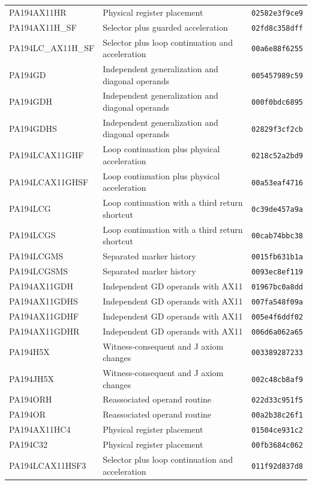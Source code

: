 \begin{longtable}{p{43mm}p{73mm}p{25mm}}
PA194AX11HR & Physical register placement & \texttt{02582e3f9ce9}\\
PA194AX11H\_SF & Selector plus guarded acceleration & \texttt{02fd8c358dff}\\
PA194LC\_AX11H\_SF & Selector plus loop continuation and acceleration & \texttt{00a6e88f6255}\\
PA194GD & Independent generalization and diagonal operands & \texttt{005457989c59}\\
PA194GDH & Independent generalization and diagonal operands & \texttt{000f0bdc6895}\\
PA194GDHS & Independent generalization and diagonal operands & \texttt{02829f3cf2cb}\\
PA194LCAX11GHF & Loop continuation plus physical acceleration & \texttt{0218c52a2bd9}\\
PA194LCAX11GHSF & Loop continuation plus physical acceleration & \texttt{00a53eaf4716}\\
PA194LCG & Loop continuation with a third return shortcut & \texttt{0c39de457a9a}\\
PA194LCGS & Loop continuation with a third return shortcut & \texttt{00cab74bbc38}\\
PA194LCGMS & Separated marker history & \texttt{0015fb631b1a}\\
PA194LCGSMS & Separated marker history & \texttt{0093ec8ef119}\\
PA194AX11GDH & Independent GD operands with AX11 & \texttt{01967bc0a8dd}\\
PA194AX11GDHS & Independent GD operands with AX11 & \texttt{007fa548f09a}\\
PA194AX11GDHF & Independent GD operands with AX11 & \texttt{005e4f6ddf02}\\
PA194AX11GDHR & Independent GD operands with AX11 & \texttt{006d6a062a65}\\
PA194H5X & Witness-consequent and J axiom changes & \texttt{003389287233}\\
PA194JH5X & Witness-consequent and J axiom changes & \texttt{002c48cb8af9}\\
PA194ORH & Reassociated operand routine & \texttt{022d33c951f5}\\
PA194OR & Reassociated operand routine & \texttt{00a2b38c26f1}\\
PA194AX11HC4 & Physical register placement & \texttt{01504ce931c2}\\
PA194C32 & Physical register placement & \texttt{00fb3684c062}\\
PA194LCAX11HSF3 & Selector plus loop continuation and acceleration & \texttt{011f92d837d8}\\

\end{longtable}
